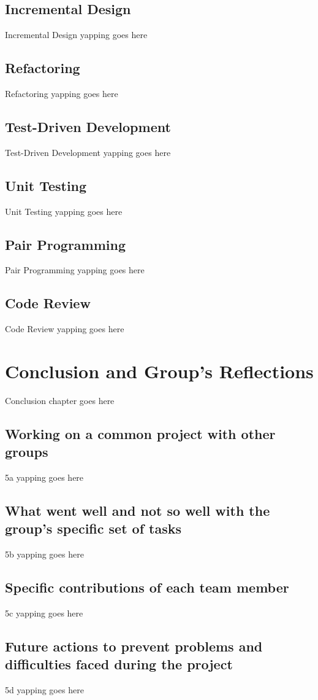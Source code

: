 \documentclass[12pt]{report}
\begin{document}
\section{Incremental Design}
Incremental Design yapping goes here

\section{Refactoring}
Refactoring yapping goes here

\section{Test-Driven Development}
Test-Driven Development yapping goes here

\section{Unit Testing}
Unit Testing yapping goes here

\section{Pair Programming}
Pair Programming yapping goes here

\section{Code Review}
Code Review yapping goes here

\chapter{Conclusion and Group's Reflections}
Conclusion chapter goes here

\section{Working on a common project with other groups}
5a yapping goes here

\section{What went well and not so well with the group's specific set of tasks}
5b yapping goes here

\section{Specific contributions of each team member}
5c yapping goes here

\section{Future actions to prevent problems and difficulties faced during the project}
5d yapping goes here
\end{document}
